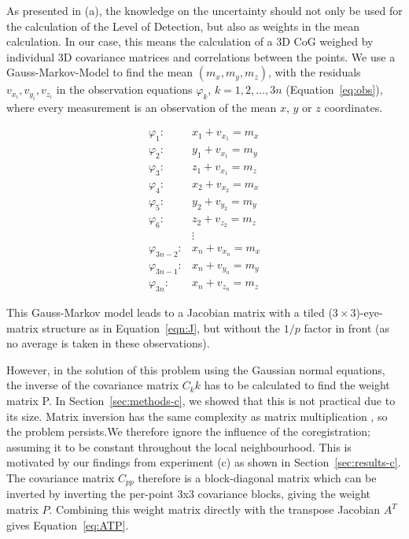 \documentclass[preprint,12pt,3p]{elsarticle}
\begin{document}
As presented in (a), the knowledge on the uncertainty should not only be used for the calculation of the Level of Detection, but also as weights in the mean calculation. In our case, this means the calculation of a 3D CoG weighed by individual 3D covariance matrices and correlations between the points. We use a Gauss-Markov-Model to find the mean $(m_x, m_y, m_z)$, with the residuals $v_{x_i}, v_{y_i}, v_{z_i}$ in the observation equations $\varphi_k$, $k=1,2,\dots,3n$ (Equation~\ref{eq:obs}), where every measurement is an observation of the mean $x$, $y$ or $z$ coordinates.

\begin{equation}
\begin{array}{rl}
\varphi_1:& x_1 + v_{x_1} = m_x\\
\varphi_2:& y_1 + v_{x_1} = m_y\\
\varphi_3:& z_1 + v_{x_1} = m_z\\
\varphi_4:& x_2 + v_{x_2} = m_x\\
\varphi_5:& y_2 + v_{y_2} = m_y\\
\varphi_6:& z_2 + v_{z_2} = m_z\\
&\vdots \\
\varphi_{3n-2}:& x_n + v_{x_n} = m_x\\
\varphi_{3n-1}:& x_n + v_{y_n} = m_y\\
\varphi_{3n}:& x_n + v_{z_n} = m_z
\end{array}
\label{eq:obs}
\end{equation}

This Gauss-Markov model leads to a Jacobian matrix with a tiled ($3\times3$)-eye-matrix structure as in Equation~\ref{eqn:J}, but without the $1/p$ factor in front (as no average is taken in these observations).

However, in the solution of this problem using the Gaussian normal equations, the inverse of the covariance matrix $C_kk$ has to be calculated to find the weight matrix P. In Section~\ref{sec:methods-c}, we showed that this is not practical due to its size. Matrix inversion has the same complexity as matrix multiplication \citep{cormen2009introduction}, so the problem persists.We therefore ignore the influence of the coregistration; assuming it to be constant throughout the local neighbourhood. This is motivated by our findings from experiment (c) as shown in Section~\ref{sec:results-c}. The covariance matrix $C_{pp}$ therefore is a block-diagonal matrix which can be inverted by inverting the per-point 3x3 covariance blocks, giving the weight matrix $P$. Combining this weight matrix directly with the transpose Jacobian $A^T$ gives Equation~\ref{eq:ATP}.
\end{document}
